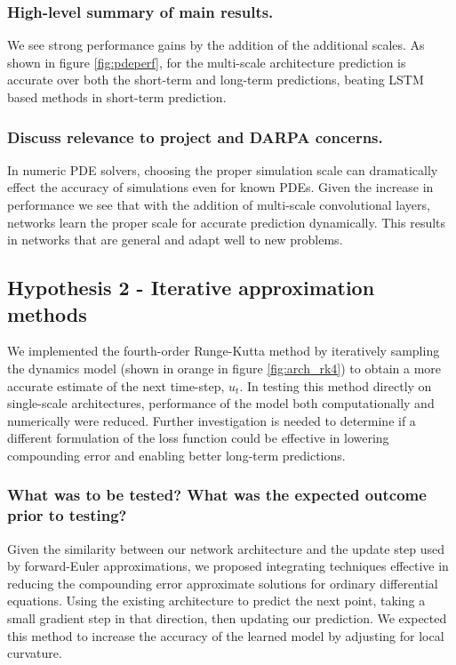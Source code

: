 \documentclass[12pt]{article}
\theoremstyle{plain}
\theoremstyle{remark}
\theoremstyle{definition}
\begin{document}
\subsubsection{High-level summary of main results.}
	We see strong performance gains by the addition of the additional scales. As shown in figure \ref{fig:pdeperf}, for the multi-scale architecture prediction is accurate over both the short-term and long-term predictions, beating LSTM based methods in short-term prediction.  


\subsubsection{Discuss relevance to project and DARPA concerns.}
	In numeric PDE solvers, choosing the proper simulation scale can dramatically effect the accuracy of simulations even for known PDEs. Given the increase in performance we see that with the addition of multi-scale convolutional layers, networks learn the proper scale for accurate prediction dynamically. This results in networks that are general and adapt well to new problems.


\subsection{Hypothesis 2 - Iterative approximation methods}

 We implemented the fourth-order Runge-Kutta method by iteratively sampling the dynamics model (shown in orange in figure \ref{fig:arch_rk4}) to obtain a more accurate estimate of the next time-step, $u_t$. In testing this method directly on single-scale architectures, performance of the model both computationally and numerically were reduced. Further investigation is needed to determine if a different formulation of the loss function could be effective in lowering compounding error and enabling better long-term predictions. 

\subsubsection{What was to be tested? What was the expected outcome prior to testing?}
	Given the similarity between our network architecture and the update step used by forward-Euler approximations, we proposed integrating techniques effective in reducing the compounding error approximate solutions for ordinary differential equations. Using the existing architecture to predict the next point, taking a small gradient step in that direction, then updating our prediction. We expected this method to increase the accuracy of the learned model by adjusting for local curvature. 
\end{document}
